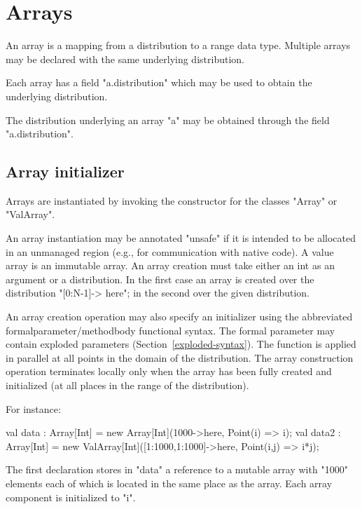 \chapter{Arrays}\label{XtenArrays}

An array is a mapping from a distribution to a range data
type. Multiple arrays may be declared with the same underlying
distribution. 

Each array has a field \xcd"a.distribution" which may be used to
obtain the underlying
distribution.

The distribution underlying an array \xcd"a" may be obtained through
the field \xcd"a.distribution".



\section{Array initializer}\label{ArrayInitializer}\label{array!creation}

Arrays are instantiated by invoking the constructor for the
classes
\xcd"Array" or \xcd"ValArray".

An array instantiation may be annotated
\xcd"unsafe"
if it is intended to be
allocated in an unmanaged region (e.g., for communication with native
code). A value array is an immutable array. An array creation
must take either an int as an argument or a distribution. In the first
case an array is created over the distribution \xcd"[0:N-1]-> here";
in the second over the given distribution. 

An array creation operation may also specify an initializer using the
abbreviated formalparameter/methodbody functional syntax. The formal
parameter may contain exploded parameters
(Section~\ref{exploded-syntax}). The function is applied in parallel
at all points in the domain of the distribution. The array
construction operation terminates locally only when the array has been
fully created and initialized (at all places in the range of the
distribution).

For instance:
\begin{xten}
val data : Array[Int]
    = new Array[Int](1000->here, Point(i) => i);
val data2 : Array[Int]
    = new ValArray[Int]([1:1000,1:1000]->here, Point(i,j) => i*j);
\end{xten}

{}\noindent 
The first declaration stores in \xcd"data" a reference to a mutable
array with \xcd"1000" elements each of which is located in the
same place as the array. Each array component is initialized to \xcd"i".

